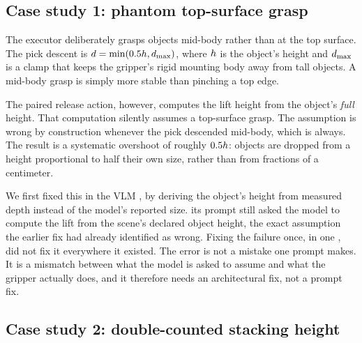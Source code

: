 
\subsection{Case study 1: phantom top-surface grasp}
\label{sec:case-phantom}

The executor deliberately grasps objects mid-body rather than at the
top surface. The pick descent is $d = \min(0.5h,
d_{\max})$, where $h$ is the object's height and
$d_{\max}$ is a clamp that keeps the gripper's rigid mounting
body away from tall objects. A mid-body grasp is simply more stable
than pinching a top edge.

The paired release action, however, computes the lift height from
the object's \emph{full} height. That computation silently assumes a
top-surface grasp. The assumption is wrong by construction whenever
the pick descended mid-body, which is always. The result is a
systematic overshoot of roughly $0.5h$: objects are dropped from
a height proportional to half their own size, rather than from
fractions of a centimeter.

We first fixed this in the VLM , by deriving the
object's height from measured depth instead of the model's reported
size.  its prompt still asked the model to compute the lift
from the scene's declared object height, the exact assumption the
earlier fix had already identified as wrong. Fixing the failure once,
in one , did not fix it everywhere it existed. The
error is not a mistake one prompt makes. It is a mismatch between what
the model is asked to assume and what the gripper actually does, and
it therefore needs an architectural fix, not a prompt fix.

\subsection{Case study 2: double-counted stacking height}
\label{sec:case-doublecount}

